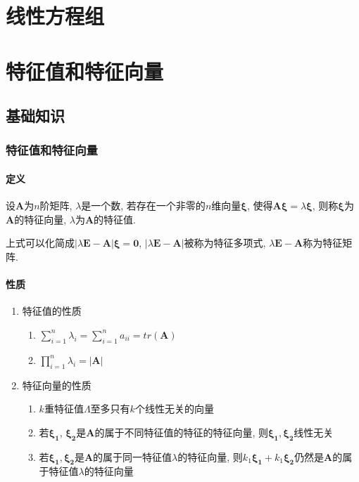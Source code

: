 \chapter{线性方程组}

\chapter{特征值和特征向量}
\section{基础知识}
\subsection{特征值和特征向量}
\subsubsection{定义}
设$ \bm{A} $为$ n $阶矩阵, $ \lambda $是一个数, 若存在一个非零的$ n $维向量$ \bm{\xi} $, 使得$ \bm{A}\bm{\xi}=\lambda \bm{\xi} $, 则称$ \bm{\xi} $为$ \bm{A} $的特征向量, $ \lambda $为$ \bm{A} $的特征值. 
\par 上式可以化简成$ \left| \lambda \bm{E}-\bm{A}\right|\bm{\xi}=\bm{0} $, $ \left| \lambda \bm{E}-\bm{A}\right| $被称为特征多项式, $ \lambda \bm{E}-\bm{A} $称为特征矩阵.
\subsubsection{性质}
\begin{enumerate}
	\item 特征值的性质
	\begin{enumerate}
		\item $ \sum_{i=1}^{n}\lambda_{i}=\sum_{i=1}^{n}a_{ii}=tr(\bm{A}) $
		\item $ \prod_{i=1}^{n}\lambda_{i}=\left| \bm{A}\right| $
	\end{enumerate}
	\item 特征向量的性质
	\begin{enumerate}
		\item $ k $重特征值$ \Lambda $至多只有$ k $个线性无关的向量
		\item 若$ \bm{\xi_1} $, $ \bm{\xi_2} $是$ \bm{A} $的属于不同特征值的特征的特征向量, 则$ \bm{\xi_1}, \bm{\xi_2} $线性无关
		\item 若$ \bm{\xi_1}, \bm{\xi_2} $是$ \bm{A} $的属于同一特征值$ \lambda $的特征向量, 则$ k_1\bm{\xi_1} + k_1\bm{\xi_2} $仍然是$ \bm{A} $的属于特征值$ \lambda $的特征向量
	\end{enumerate}
\end{enumerate}
